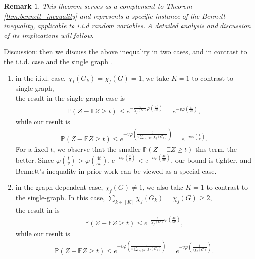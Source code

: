 \documentclass{article}
\def\eE{\mathbb{E}}
\def\pP{\mathbb{P}}
\newtheorem*{remark}{Remark}
\begin{document}
\begin{remark}
    This theorem serves as a complement to Theorem \ref{thm:bennett_inequality} and represents a specific instance of the Bennett inequality, applicable to i.i.d random variables. A detailed analysis and discussion of its implications will follow.
\end{remark}
Discussion:
then we discuss the above inequality in two cases, and in contrast to the i.i.d. case \cite{Bartlett_2005,yousefi18,watkins2023optimistic} and the single graph \cite{ralaivola2015entropy}. 
\begin{enumerate}[(1)]
    \item in the i.i.d. case, $\chi _f(G_k) = \chi _f(G) = 1 $, we take $K = 1$ to contrast to single-graph, \\
    the result in the single-graph case is  
    \begin{align*}
       \pP (Z - \eE Z \geq t) \leq e^{-\frac{v}{\chi _f(G)} \varphi (\frac{4t}{5v})} = e^{-v \varphi (\frac{4t}{5v})}, 
    \end{align*}
    while our result is  
    \begin{align*}
        \pP (Z - \eE Z \geq t) \leq e^{-v \varphi (\frac{t}{v \sum _{k \in [K]} \chi _f(G_k)})} = e^{-v \varphi (\frac{t}{v})}.
    \end{align*} 
For a fixed $t$, we observe that the smaller $ \pP (Z - \eE Z \geq t) $ this term, the better. Since $\varphi (\frac{t}{v}) > \varphi (\frac{4t}{5v})$, $e^{-v \varphi (\frac{t}{v})} < e^{-v \varphi (\frac{4t}{5v})}$, our bound is tighter, and Bennett's inequality in prior work can be viewed as a special case. 

    \item in the graph-dependent case, $\chi_f(G) \neq 1$, we also take $K =1$ to contrast to the single-graph. In this case, $\sum _{k \in [K]} \chi _f(G_k) = \chi _f(G) \geq 2$,  \\
    the result in \cite{ralaivola2015entropy} is  
    \begin{align*}
       \pP (Z - \eE Z \geq t) \leq e^{-\frac{v}{\chi _f(G)} \varphi (\frac{4t}{5v})}, 
    \end{align*}
    while our result is  
    \begin{align*}
        \pP (Z - \eE Z \geq t) \leq e^{-v \varphi (\frac{t}{v \sum _{k \in [K]} \chi _f(G_k)})} = e^{-v \varphi (\frac{t}{v \chi _f(G)})}.
    \end{align*}


\end{enumerate}
\end{document}
